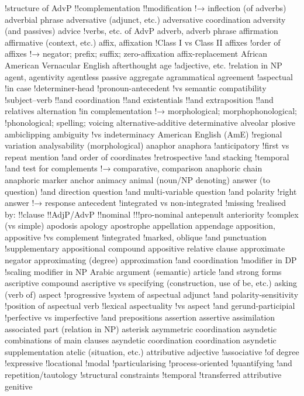 !structure of AdvP
!!complementation
!!modification
!→ inflection (of adverbs)
adverbial phrase
adversative (adjunct, etc.)
adversative coordination
adversity (and passives)
advice
!verbs, etc. of
AdvP adverb, adverb phrase
affirmation
affirmative (context, etc.)
affix, affixation
!Class I vs Class II affixes
!order of affixes
!→ negator; prefix; suffix; zero-affixation
affix-replacement
African American Vernacular English
afterthought
age
!adjective, etc.
!relation in NP
agent, agentivity
agentless passive
aggregate
agrammatical
agreement
!aspectual
!in case
!determiner-head
!pronoun-antecedent
!vs semantic compatibility
!subject--verb
!!and coordination
!!and existentials
!!and extraposition
!!and relatives
alternation
!in complementation
!→ morphological; morphophonological;
!phonological; spelling; voicing
alternative-additive determinative
alveolar plosive
ambiclipping
ambiguity
!vs indeterminacy
American English (AmE)
!regional variation
analysability (morphological)
anaphor
anaphora
!anticipatory
!first vs repeat mention
!and order of coordinates
!retrospective
!and stacking
!temporal
!and test for complements
!→ comparative, comparison
anaphoric chain
anaphoric marker
anchor
animacy
animal (noun/NP denoting)
answer (to question)
!and direction question
!and multi-variable question
!and polarity
!right answer
!→ response
antecedent
!integrated vs non-integrated
!missing
!realised by:
!!clause
!!AdjP/AdvP
!!nominal
!!!pro-nominal
antepenult
anteriority
!complex (vs simple)
apodosis
apology
apostrophe
appellation
appendage
apposition, appositive
!vs complement
!integrated
!marked, oblique
!and punctuation
!supplementary
appositional compound
appositive relative clause
approximate negator
approximating (degree)
approximation
!and coordination
!modifier in DP
!scaling modifier in NP
Arabic
argument (semantic)
article
!and strong forms
ascriptive compound
ascriptive vs specifying (construction, use of be, etc.)
asking (verb of)
aspect
!progressive
!system of
aspectual adjunct
!and polarity-sensitivity
!position of
aspectual verb
!lexical
aspectuality
!vs aspect
!and gerund-participial
!perfective vs imperfective
!and prepositions
assertion
assertive
assimilation
associated part (relation in NP)
asterisk
asymmetric coordination
asyndetic combinations of main clauses
asyndetic coordination coordination
asyndetic supplementation
atelic (situation, etc.)
attributive adjective
!associative
!of degree
!expressive
!locational
!modal
!particularising
!process-oriented
!quantifying
!and repetition/tautology
!structural constraints
!temporal
!transferred
attributive genitive
